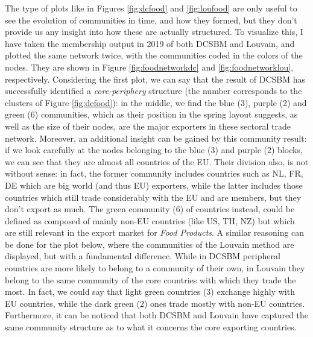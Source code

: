 The type of plots like in Figures \ref{fig:dcfood} and \ref{fig:loufood} are only useful to see the evolution of communities in time, and how they formed, but they don't provide us any insight into how these are actually structured. To visualize this, I have taken the membership output in 2019 of both DCSBM and Louvain, and plotted the same network twice, with the communities coded in the colors of the nodes. They are shown in Figure \ref{fig:foodnetworkdc} and \ref{fig:foodnetworklou}, respectively. Considering the first plot, we can say that the result of DCSBM has successfully identified a \textit{core-periphery} structure (the number corresponds to the clusters of Figure \ref{fig:dcfood}): in the middle, we find the blue (3), purple (2) and green (6) communities, which as their position in the spring layout suggests, as well as the size of their nodes, are the major exporters in these sectoral trade network. Moreover, an additional insight can be gained by this community result: if we look carefully at the nodes belonging to the blue (3) and purple (2) blocks, we can see that they are almost all countries of the EU. Their division also, is not without sense: in fact, the former community includes countries such as NL, FR, DE which are big world (and thus EU) exporters, while the latter includes those countries which still trade considerably with the EU and are members, but they don't export as much. The green community (6) of countries instead, could be defined as composed of mainly non-EU countries (like US, TH, NZ) but which are still relevant in the export market for \textit{Food Products}. A similar reasoning can be done for the plot below, where the communities of the Louvain method are displayed, but with a fundamental difference. While in DCSBM peripheral countries are more likely to belong to a community of their own, in Louvain they belong to the same community of the core countries with which they trade the most. In fact, we could say that light green countries (3) exchange highly with EU countries, while the dark green (2) ones trade mostly with non-EU countries. Furthermore, it can be noticed that both DCSBM and Louvain have captured the same community structure as to what it concerns the core exporting countries.

